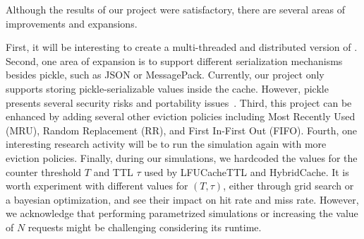 Although the results of our project were satisfactory,
there are several areas of improvements and expansions.

First, it will be interesting to create a multi-threaded and
distributed version of \sqlitecache.
Second, one area of expansion is to support different
serialization mechanisms besides pickle, such as JSON or
MessagePack.
Currently, our project only supports storing pickle-serializable
values inside the cache. However, pickle presents
several security risks and portability issues~\cite{arjancodesPickle}.
Third, this project can be enhanced by adding
several other eviction policies including
Most Recently Used (MRU), Random Replacement (RR),
and First In-First Out (FIFO). Fourth,
one interesting research activity will be to run
the simulation again with more eviction policies.
Finally, during our simulations, we hardcoded
the values for the counter threshold $T$ and TTL $\tau$
used by LFUCacheTTL and HybridCache. It is worth
experiment with different values for $(T, \tau)$,
either through grid search or a bayesian optimization,
and see their impact on hit rate and miss rate.
However, we acknowledge that performing parametrized
simulations or increasing the value of $N$ requests
might be challenging considering its runtime.